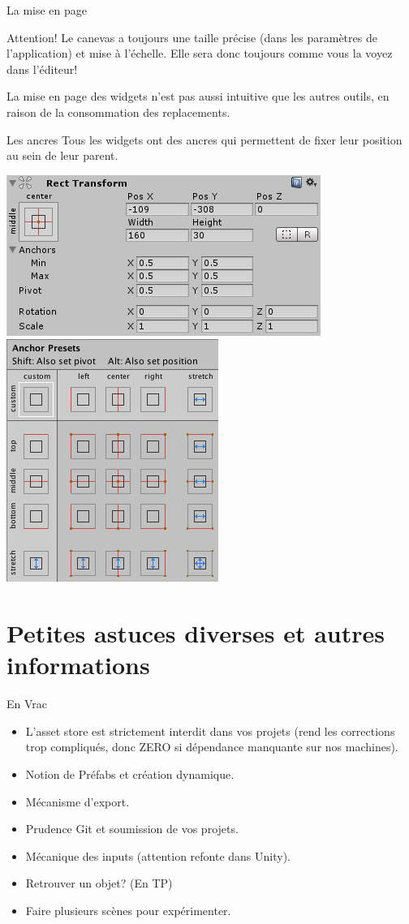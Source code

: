 \begin{frame}{La mise en page}
	\begin{alertblock}{Attention!}
Le canevas a toujours une taille précise (dans les paramètres de l'application) et mise à l'échelle. Elle sera donc toujours comme vous la voyez dans l'éditeur!

La mise en page des widgets n'est pas aussi intuitive que les autres outils, en raison de la consommation des replacements.
		
	\end{alertblock}

\begin{block}{Les ancres}
	Tous les widgets ont des ancres qui permettent de fixer leur position au sein de leur parent. 
\end{block}

\hfill
	\includegraphics[width=0.45\linewidth]{../../imgs/UI_RectTransform}
\hfill
	\includegraphics[width=0.25\linewidth]{../../imgs/UI_AnchorPreset}
\hfill


\end{frame}

\section{Petites astuces diverses et autres informations}

\begin{frame}{En Vrac}
\begin{itemize}
	\item L'asset store est strictement interdit dans vos projets (rend les corrections trop compliqués, donc ZERO si dépendance manquante sur nos machines).
	\item Notion de Préfabs et création dynamique.
	\item Mécanisme d'export.
	\item Prudence Git et soumission de vos projets.
	\item Mécanique des inputs (attention refonte dans Unity).
	\item Retrouver un objet? (En TP)
	\item Faire plusieurs scènes pour expérimenter.
\end{itemize}
\end{frame}


  
